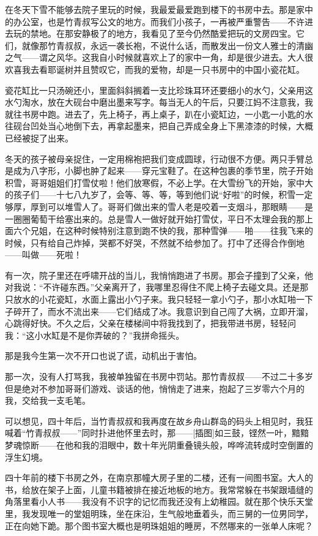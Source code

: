 \par 在冬天下雪不能够去院子里玩的时候，我最爱最爱跑到楼下的书房中去。那是家中的办公室，也是竹青叔写公文的地方。而我们小孩子，一再被严重警告——不许进去玩的禁地。在那安静极了的地方，我看见了至今仍然酷爱把玩的文房四宝。它们，就像那竹青叔叔，永远一袭长袍，不说什么话，而散发出一份文人雅士的清幽之气——谓之风华。这我自小时候就喜欢上了的家中一角，却是很少进去。大人很欢喜我去看耶诞树并且赞叹它，而我的爱物，却是一只书房中的中国小瓷花缸。
\par 瓷花缸比一只汤碗还小，里面斜斜搁着一支比珍珠耳环还要细小的水勺，父亲用这水勺淘水，放在大砚台中磨出墨来写字。每当无人的午后，只要江妈不注意我，我就往书房中跑。进去了，先上椅子，再上桌子，趴在小瓷缸边，一小匙一小匙的水往砚台凹处当心地倒下去，再拿起墨来，把自己弄成全身上下黑漆漆的时候，大概已经被捉了出来。
\par 冬天的孩子被母亲捉住，一定用棉袍把我们变成圆球，行动很不方便。两只手臂总是成为八字形，小脚也肿了起来——穿元宝鞋了。在这种包裹的季节里，院子开始积雪，哥哥姐姐们打雪仗啦！他们放寒假，不必上学。在大雪纷飞的开始，家中大的孩子们——十七八九岁了，会等、等、等，等到他们说“好啦”的时候，积雪一定够厚，厚到可以堆雪人了。哥哥们做出来的雪人老是咬着一支烟斗，那眼睛——是一圈圈葡萄干给塞出来的。总是雪人一做好就开始打雪仗，平日不太理会我的那上面六个兄姐，在这种时候特别注意到跑不快的我，那种雪弹——啪——往我飞来的时候，只有给自己炸掉，哭都不好哭，不然就不给参加了。打中了还得合作倒地——叫做——死啦！
\par 有一次，院子里还在呼啸开战的当儿，我悄悄跑进了书房。那会子撞到了父亲，他对我说：“不许碰东西。”父亲离开了，我哪里忍得住不爬上椅子去碰文具。还是那只放水的小花瓷缸，水面上露出小勺子来。我只轻轻一拿小勺子，那小水缸啪一下子碎开了，而水不流出来——它们结成了冰。我意识到自己闯了大祸，立即开溜，心跳得好快。不久之后，父亲在楼梯间中将我找到了，把我带进书房，轻轻问我：“这小水缸是不是你弄破的？”我拼命摇头。
\par 那是我今生第一次不开口也说了谎，动机出于害怕。
\par 那一次，没有人打骂我，我被单独留在书房中罚站。那竹青叔叔——不过二十多岁但是绝对不参加哥哥们游戏、谈话的他，悄悄走了进来，抱起了三岁零六个月的我，交给我一支毛笔。
\par 可以想见，四十年后，当竹青叔叔和我再度在故乡舟山群岛的码头上相见时，我狂喊着“竹青叔叔——”同时扑进他怀里去时，那——[插图]如三鼓，铿然一叶，黯黯梦魂惊断——在他和我的泪眼中，数十年光阴重叠镜头般，哗哗流转成时空倒置的浮生幻境。
\par 四十年前的楼下书房之外，在南京那幢大房子里的二楼，还有一间图书室。大人的书，给放在架子上面，儿童书籍被排在接近地板的地方。我常常躲在书架跟墙缝的角落里看小人书——我没有不识字的记忆而我还没有上幼稚园。就在那个快乐天堂里，我发现唯一的堂姐明珠，坐在床沿，生气般地垂着头，而三舅的一位男同学，正在向她下跪。那个图书室大概也是明珠姐姐的睡房，不然哪来的一张单人床呢？
